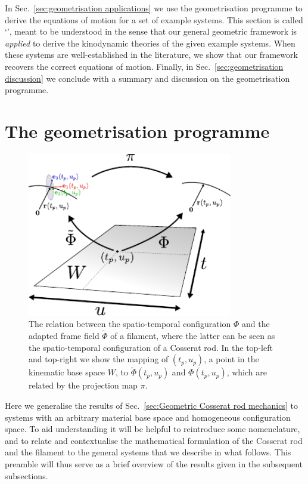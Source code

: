 In Sec.~\ref{sec:geometrisation applications} we use the geometrisation programme to derive the equations of motion for a set of example systems. This section is called `', meant to be understood in the sense that our general geometric framework is \emph{applied} to derive the kinodynamic theories of the given example systems. When these systems are well-established in the literature, we show that our framework recovers the correct equations of motion. Finally, in Sec.~\ref{sec:geometrisation discussion} we conclude with a summary and discussion on the geometrisation programme.

\section{The geometrisation programme} \label{sec:The geometrisation programme}

\begin{figure}[t]
\centering
        \includegraphics[width=0.8\textwidth]{figs_part2/ch8_geometrisation/cosserat_geometrisation.pdf}
        \caption{The relation between the spatio-temporal configuration $\Phi$ and the adapted frame field $\tilde{\Phi}$ of a filament, where the latter can be seen as the spatio-temporal configuration of a Cosserat rod. In the top-left and top-right we show the mapping of $(t_p, u_p)$, a point in the kinematic base space $W$, to $\tilde{\Phi}(t_p, u_p)$ and $\Phi(t_p, u_p)$, which are related by the projection map $\pi$.}\label{fig:cosserat rod geometrisation illustration}
\end{figure}

Here we generalise the results of Sec.~\ref{sec:Geometric Cosserat rod mechanics} to systems with an arbitrary material base space and homogeneous configuration space. To aid understanding it will be helpful to reintroduce some nomenclature, and to relate and contextualise the mathematical formulation of the Cosserat rod and the filament to the general systems that we describe in what follows. This preamble will thus serve as a brief overview of the results given in the subsequent subsections.


